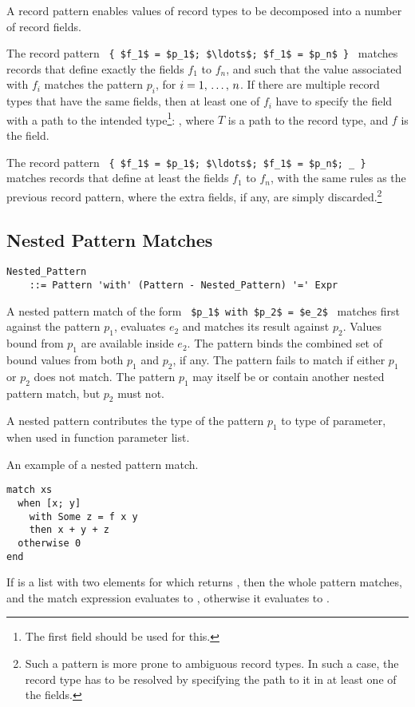 A record pattern enables values of record types to be decomposed into a number of record fields. 

The record pattern ~\lstinline!{ $f_1$ = $p_1$; $\ldots$; $f_1$ = $p_n$ }!~ matches records that define exactly the fields $f_1$ to $f_n$, and such that the value associated with $f_i$ matches the pattern $p_i$, for $i = 1 ,\, \ldots ,\, n$. If there are multiple record types that have the same fields, then at least one of $f_i$ have to specify the field with a path to the intended type\footnote{The first field should be used for this.}: , where $T$ is a path to the record type, and $f$ is the field. 

The record pattern ~\lstinline!{ $f_1$ = $p_1$; $\ldots$; $f_1$ = $p_n$; _ }!~ matches records that define at least the fields $f_1$ to $f_n$, with the same rules as the previous record pattern, where the extra fields, if any, are simply discarded.\footnote{Such a pattern is more prone to ambiguous record types. In such a case, the record type has to be resolved by specifying the path to it in at least one of the fields.}





\subsection{Nested Pattern Matches}
\label{sec:nested-pattern-matches}

\grammar\begin{lstlisting}
Nested_Pattern 
    ::= Pattern 'with' (Pattern - Nested_Pattern) '=' Expr
\end{lstlisting}

A nested pattern match of the form ~\lstinline!$p_1$ with $p_2$ = $e_2$!~ matches first against the pattern $p_1$, evaluates $e_2$ and matches its result against $p_2$. Values bound from $p_1$ are available inside $e_2$. The pattern binds the combined set of bound values from both $p_1$ and $p_2$, if any. The pattern fails to match if either $p_1$ or $p_2$ does not match. The pattern $p_1$ may itself be or contain another nested pattern match, but $p_2$ must not. 

A nested pattern contributes the type of the pattern $p_1$ to type of parameter, when used in function parameter list. 

\example An example of a nested pattern match.
\begin{lstlisting}
match xs
  when [x; y] 
    with Some z = f x y 
    then x + y + z
  otherwise 0
end
\end{lstlisting}
If  is a list with two elements for which  returns , then the whole pattern matches, and the match expression evaluates to , otherwise it evaluates to . 




